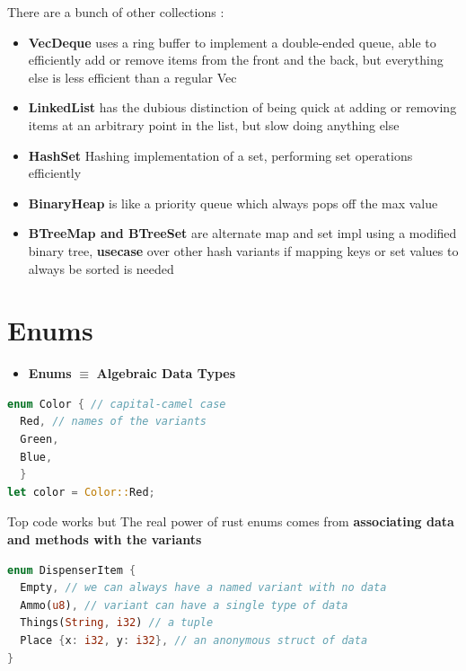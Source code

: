\documentclass{report}
\begin{document}
\begin{multicols*}{2}
There are a bunch of other collections :
\begin{itemize}
  \item \textbf{VecDeque} uses a ring buffer to implement a double-ended queue, able to efficiently add or remove items from the front and the back,
    but everything else is less efficient than a regular Vec 
  \item \textbf{LinkedList} has the dubious distinction of being quick at adding or removing items at an arbitrary point in the list, but slow doing anything else
  \item \textbf{HashSet} Hashing implementation of a set, performing set operations efficiently 
  \item \textbf{BinaryHeap} is like a priority queue which always pops off the max value
  \item \textbf{BTreeMap and BTreeSet} are alternate map and set impl using a modified binary tree, \textbf{usecase} over other hash variants if mapping keys or set values to always be sorted is needed
\end{itemize}


\section{Enums}

\begin{itemize}
  \item \textbf{Enums} $\equiv $ \textbf{Algebraic Data Types}
\end{itemize}

\begin{tcolorbox}[title=Syntax,colback=backcolour,size=small,left=4mm]
\begin{lstlisting}[language=rust]
enum Color { // capital-camel case
  Red, // names of the variants
  Green,
  Blue,
  }
let color = Color::Red;
\end{lstlisting}
\end{tcolorbox}

Top code works but The real power of rust enums comes from \textbf{associating data and methods with the variants}

\begin{tcolorbox}[colback=backcolour,size=small,left=4mm]
\begin{lstlisting}[language=rust]
enum DispenserItem { 
  Empty, // we can always have a named variant with no data
  Ammo(u8), // variant can have a single type of data
  Things(String, i32) // a tuple
  Place {x: i32, y: i32}, // an anonymous struct of data
}


\end{lstlisting}
\end{tcolorbox}
\end{multicols*}
\end{document}
